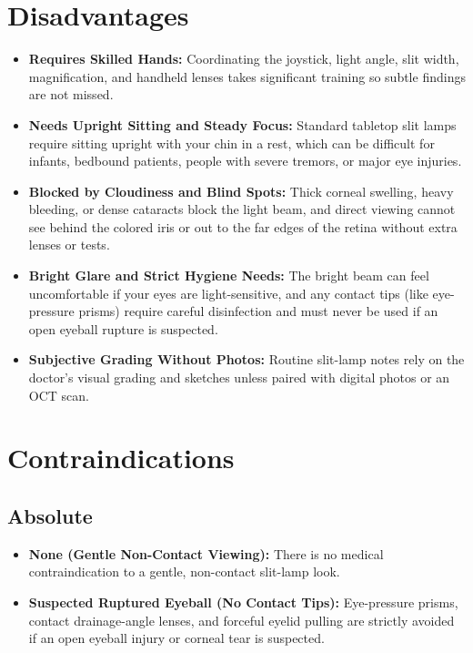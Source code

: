 \section{Disadvantages}

\begin{itemize}
    \item \textbf{Requires Skilled Hands:} Coordinating the joystick, light angle, slit width, magnification, and handheld lenses takes significant training so subtle findings are not missed.
    \item \textbf{Needs Upright Sitting and Steady Focus:} Standard tabletop slit lamps require sitting upright with your chin in a rest, which can be difficult for infants, bedbound patients, people with severe tremors, or major eye injuries.
    \item \textbf{Blocked by Cloudiness and Blind Spots:} Thick corneal swelling, heavy bleeding, or dense cataracts block the light beam, and direct viewing cannot see behind the colored iris or out to the far edges of the retina without extra lenses or tests.
    \item \textbf{Bright Glare and Strict Hygiene Needs:} The bright beam can feel uncomfortable if your eyes are light-sensitive, and any contact tips (like eye-pressure prisms) require careful disinfection and must never be used if an open eyeball rupture is suspected.
    \item \textbf{Subjective Grading Without Photos:} Routine slit-lamp notes rely on the doctor's visual grading and sketches unless paired with digital photos or an OCT scan.
\end{itemize}

\section{Contraindications}

\subsection{Absolute}

\begin{itemize}
    \item \textbf{None (Gentle Non-Contact Viewing):} There is no medical contraindication to a gentle, non-contact slit-lamp look.
    \item \textbf{Suspected Ruptured Eyeball (No Contact Tips):} Eye-pressure prisms, contact drainage-angle lenses, and forceful eyelid pulling are strictly avoided if an open eyeball injury or corneal tear is suspected.
\end{itemize}


